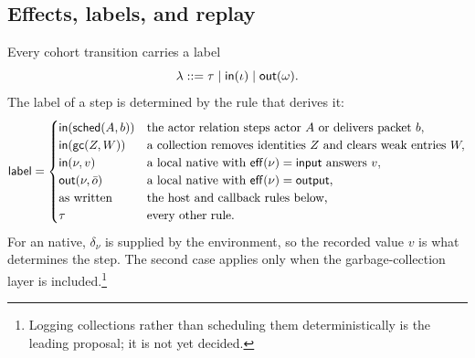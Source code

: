 \subsection{Effects, labels, and replay}

Every cohort transition carries a label
\begin{equation}\label{eq:kernel-labels}
 \lambda::=\tau\mid\mathsf{in}(\iota)\mid\mathsf{out}(\omega).
\end{equation}
The label of a step is determined by the rule that derives it:
\begin{equation}\label{eq:kernel-step-labels}
 \mathsf{label}=
 \begin{cases}
  \mathsf{in}(\mathsf{sched}(A,b)) & \text{the actor relation steps actor }A
       \text{ or delivers packet }b,\\
  \mathsf{in}(\mathsf{gc}(Z,W)) & \text{a collection removes identities }Z
       \text{ and clears weak entries }W,\\
  \mathsf{in}(\nu,v) & \text{a local native with }\mathsf{eff}(\nu)=\mathsf{input}
       \text{ answers }v,\\
  \mathsf{out}(\nu,\bar o) & \text{a local native with }\mathsf{eff}(\nu)=\mathsf{output},\\
  \text{as written} & \text{the host and callback rules below,}\\
  \tau & \text{every other rule.}
 \end{cases}
\end{equation}
For an  native, $\delta_\nu$ is supplied by the environment, so the
recorded value $v$ is what determines the step.  The second case applies only
when the garbage-collection layer is included.\footnote{Logging collections
rather than scheduling them deterministically is the leading proposal; it is
not yet decided.}

